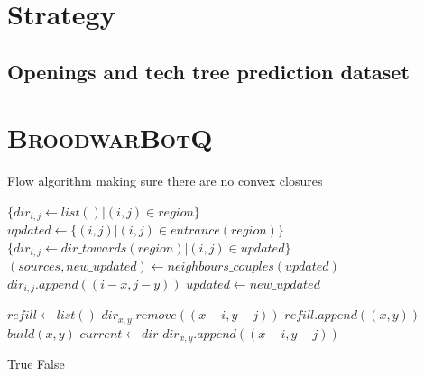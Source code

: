 \clearpage
\section{Strategy}
\subsection{Openings and tech tree prediction dataset}
\label{appdx:datasets}

%

\section{\textsc{BroodwarBotQ}}
\begin{algorithm}
\caption{Flow algorithm making sure there are no convex closures}
\label{alg:flood}
\begin{algorithmic}
    \State $\{dir_{i,j} \leftarrow list() | (i,j) \in region\}$
    \State $updated \leftarrow \{(i,j) | (i,j) \in entrance(region)\}$
    \State $\{dir_{i,j} \leftarrow dir\_towards(region) | (i,j) \in updated\}$
        \State $(sources,new\_updated) \leftarrow neighbours\_couples(updated)$
                \State $dir_{i,j}.append((i-x, j-y))$
            \EndIf
        \EndFor
        \State $updated \leftarrow new\_updated$
    \EndWhile
\EndFunction

\State $refill \leftarrow list()$
 
    \State $dir_{x,y}.remove((x-i, y-j))$
        \State $refill.append((x,y))$
        \State $build(x,y)$ 
    \EndIf
\EndFor
{} 
    \State $current \leftarrow dir$
            \State $dir_{x,y}.append((x-i, y-j))$
        \EndIf
    \EndFor
\EndWhile
\EndFunction


        \State \Return True
    \Else
        \State \Return False
    \EndIf
\EndFunction
\end{algorithmic}
\end{algorithm}

